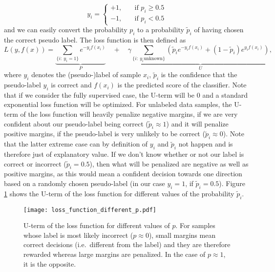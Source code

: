 \begin{equation*}
 y_i = 
    \begin{cases}
	+1, \quad & \text{if } p_i \geq 0.5 \\
	-1, \quad & \text{if } p_i < 0.5
      \end{cases}
\end{equation*}
and we can easily convert the probability $p_i$ to a probability $\tilde p_i$ of having chosen the correct pseudo label. 
The loss function is then defined as
\begin{equation*}
L(y,f(x)) = \underbrace{\sum_{\{i :~ y_i = 1\}} e^{-y_i f(x_i)}}_{P} \quad + \quad \gamma\underbrace{\sum_{\{i:~ y_i \text{unknown}\}} \left( \tilde p_i e^{-y_i f(x_i)} + (1-\tilde p_i) e^{y_i f(x_i)}\right)}_{U}, 
\end{equation*}
where $y_i$ denotes the (pseudo-)label of sample $x_i$, $\tilde p_i$ is the confidence that the pseudo-label $y_i$ is correct and $f(x_i)$ is the predicted score of the classifier.
Note that if we consider the fully supervised case, the U-term will be 0 and a standard exponential loss function will be optimized. 
For unlabeled data samples, the U-term of the loss function will heavily penalize negative margins, if we are very confident about our pseudo-label being correct ($\tilde p_i \approx 1$) and it will penalize positive margins, if the pseudo-label is very unlikely to be correct ($\tilde p_i \approx 0$). 
Note that the latter extreme case can by definition of $y_i$ and $\tilde p_i$ not happen and is therefore just of explanatory value. 
If we don't know whether or not our label is correct or incorrect ($\tilde p_i = 0.5$), then what will be penalized are negative as well as positive margins, as this would mean a confident decision towards one direction based on a randomly chosen pseudo-label (in our case $y_i = 1$, if $\tilde p_i=0.5$). Figure \ref{fig:ourlossfunctionplot} shows the U-term of the loss function for different values of the probability $\tilde p_i$.

\begin{figure}[ht]
  \centering
  \texttt{[image: loss\_function\_different\_p.pdf]}	
  \caption{U-term of the loss function for different values of $p$. For samples whose label is most likely incorrect ($p \approx 0$), small margins mean correct decisions (i.e.\ different from the label) and they are therefore rewarded whereas large margins are penalized. In the case of $p \approx 1$, it is the opposite.}
  \label{fig:ourlossfunctionplot}
\end{figure}

